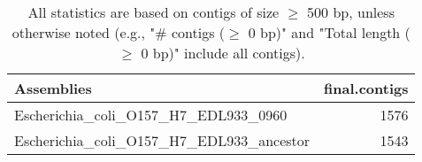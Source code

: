 \documentclass[12pt,a4paper]{article}
\begin{document}
\begin{table}[ht]
\begin{center}
\caption{All statistics are based on contigs of size $\geq$ 500 bp, unless otherwise noted (e.g., "\# contigs ($\geq$ 0 bp)" and "Total length ($\geq$ 0 bp)" include all contigs).}
\begin{tabular}{|l*{1}{|r}|}
\hline
Assemblies & final.contigs \\ \hline
Escherichia\_coli\_O157\_H7\_EDL933\_0960 & 1576 \\ \hline
Escherichia\_coli\_O157\_H7\_EDL933\_ancestor & 1543 \\ \hline
\end{tabular}
\end{center}
\end{table}
\end{document}
